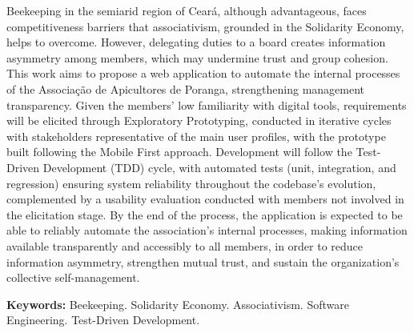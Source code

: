 Beekeeping in the semiarid region of Ceará, although advantageous, faces competitiveness barriers that associativism, grounded in the Solidarity Economy, helps to overcome. However, delegating duties to a board creates information asymmetry among members, which may undermine trust and group cohesion. This work aims to propose a web application to automate the internal processes of the Associação de Apicultores de Poranga, strengthening management transparency. Given the members' low familiarity with digital tools, requirements will be elicited through Exploratory Prototyping, conducted in iterative cycles with stakeholders representative of the main user profiles, with the prototype built following the Mobile First approach. Development will follow the Test-Driven Development (TDD) cycle, with automated tests (unit, integration, and regression) ensuring system reliability throughout the codebase's evolution, complemented by a usability evaluation conducted with members not involved in the elicitation stage. By the end of the process, the application is expected to be able to reliably automate the association's internal processes, making information available transparently and accessibly to all members, in order to reduce information asymmetry, strengthen mutual trust, and sustain the organization's collective self-management.
 
\textbf{Keywords:} Beekeeping. Solidarity Economy. Associativism. Software Engineering. Test-Driven Development.